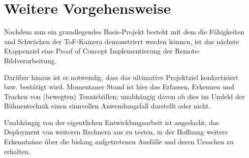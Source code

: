 \documentclass[conference, 11pt]{IEEEtran}
\begin{document}
\section{Weitere Vorgehensweise}
Nachdem nun ein grundlegendes Basis-Projekt besteht mit dem die Fähigkeiten und Schwächen der ToF-Kamera demonstriert werden können, ist das nächste Etappenziel eine Proof of Concept Implementierung der Remote-Bildverarbeitung.

Darüber hinaus ist es notwendig, dass das ultimative Projektziel konkretisiert bzw. bestätigt wird. Momentaner Stand ist hier das Erfassen, Erkennen und Tracken von (bewegten) Tennisbällen; unabhängig davon ob dies im Umfeld der Bühnentechnik einen sinnvollen Anwendungsfall darstellt oder nicht.

Unabhängig von der eigentlichen Entwicklungsarbeit ist angedacht, das Deployment von weiteren Rechnern aus zu testen, in der Hoffnung weitere Erkenntnisse über die bislang aufgetretenen Ausfälle und deren Ursachen zu erhalten.








\maketitle



\end{document}
